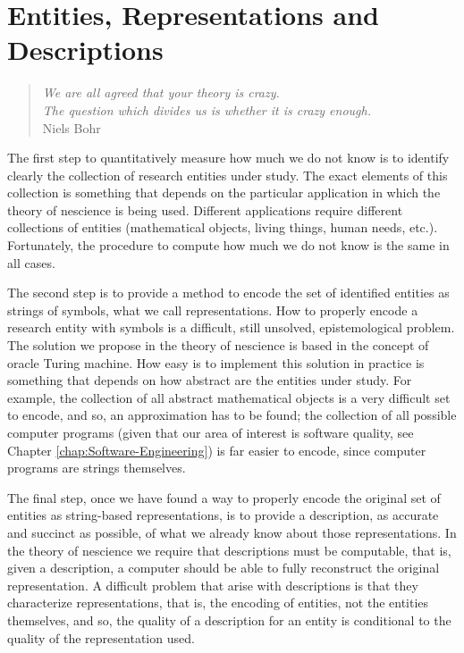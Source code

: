 %
%


\chapter{Entities, Representations and Descriptions}
\label{cha:Topics-and-Descriptions}

\begin{quote}
\begin{flushright}
\emph{We are all agreed that your theory is crazy. \\
The question which divides us is whether it is crazy enough.} \\
Niels Bohr
\end{flushright}
\end{quote}
\bigskip

The first step to quantitatively measure how much we do not know is to identify clearly the collection of research entities under study. The exact elements of this collection is something that depends on the particular application in which the theory of nescience is being used. Different applications require different collections of entities (mathematical objects, living things, human needs, etc.). Fortunately, the procedure to compute how much we do not know is the same in all cases.

The second step is to provide a method to encode the set of identified entities as strings of symbols, what we call representations. How to properly encode a research entity with symbols is a difficult, still unsolved, epistemological problem. The solution we propose in the theory of nescience is based in the concept of oracle Turing machine. How easy is to implement this solution in practice is something that depends on how abstract are the entities under study. For example, the collection of all abstract mathematical objects is a very difficult set to encode, and so, an approximation has to be found; the collection of all possible computer programs (given that our area of interest is software quality, see Chapter \ref{chap:Software-Engineering}) is far easier to encode, since computer programs are strings themselves.

The final step, once we have found a way to properly encode the original set of entities as string-based representations, is to provide a description, as accurate and succinct as possible, of what we already know about those representations. In the theory of nescience we require that descriptions must be computable, that is, given a description, a computer should be able to fully reconstruct the original representation. A difficult problem that arise with descriptions is that they characterize representations, that is, the encoding of entities, not the entities themselves, and so, the quality of a description for an entity is conditional to the quality of the representation used.

